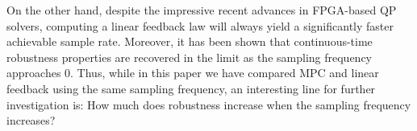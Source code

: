 \documentclass[twocolumn,twoside]{IEEEtran}
\begin{document}
On the other hand, despite the impressive recent advances in FPGA-based QP solvers, computing a linear feedback law will always yield a significantly faster achievable sample rate. Moreover, it has been shown that continuous-time robustness properties are recovered in the limit as the sampling frequency approaches 0. Thus, while in this paper we have compared MPC and linear feedback using the same sampling frequency, an interesting line for further investigation is: How much does robustness increase when the sampling frequency increases?





\end{document}
